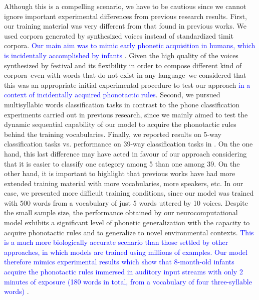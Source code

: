 \documentclass[10pt,letterpaper]{article}
\begin{document}
Although this is a compelling scenario, we have to be cautious since we cannot ignore important experimental differences from previous research results. First, our training material was very different from that found in previous works. We used corpora generated by synthesized voices instead of standardized \gls{timit} corpora.
\textcolor{blue}{Our main aim was to mimic early phonetic acquisition in humans, which is incidentally accomplished by infants \cite{Saffran1996StatisticalLB}}.
Given the high quality of the voices synthesized by \gls{festival} \cite{festival2014} and its flexibility in order to compose different kind of corpora--even with words that do not exist in any language--we considered that this was an appropriate initial experimental procedure to test our approach \textcolor{blue}{in a context of incidentally acquired phonotactic rules}. 
Second, we pursued multisyllabic words classification tasks in contrast to the phone classification experiments carried out in previous research,
since we mainly aimed to test the dynamic sequential capability of our model to acquire the phonotactic rules behind the training vocabularies. 
Finally, we reported results on 5-way classification tasks vs. performance on 39-way classification tasks in \cite{Lee:2009:UFL:2984093.2984217}. 
On the one hand, this last difference may have acted in favour of our approach considering that it is easier to classify one category among 5 than one among 39.
On the other hand, it is important to highlight that previous works have had more extended training material with more vocabularies, more speakers, etc.
In our case, we presented more difficult training conditions, since our model was trained with 500 words from a vocabulary of just 5 words uttered by 10 voices.
Despite the small sample size, the performance obtained by our neurocomputational model exhibits a significant level of phonetic generalization with the capacity to acquire phonotactic rules and to generalize to novel environmental contexts. \textcolor{blue}{This is a much more biologically accurate scenario than those settled by other approaches, in which models are trained using millions of examples. Our model therefore mimics experimental results which show that 8-month-old infants  acquire the phonotactic rules immersed in auditory input streams with only 2 minutes of exposure (180 words in total, from a vocabulary of four three-syllable words) \cite{Saffran1996StatisticalLB}}.
\end{document}
